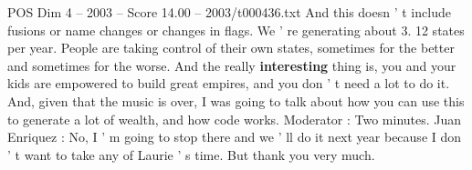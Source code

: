 \begin{textsample}{POS Dim 4 – 2003 – Score 14.00 – 2003/t000436.txt}
And this doesn ' t include fusions or name changes or changes in flags.
We ' re generating about 3. 12 states per year.
People are taking control of their own states, sometimes for the better and sometimes for the worse.
And the really \textbf{interesting} thing is, you and your kids are empowered to build great empires, and you don ' t need a lot to do it.
And, given that the music is over, I was going to talk about how you can use this to generate a lot of wealth, and how code works.
Moderator : Two minutes.
Juan Enriquez : No, I ' m going to stop there and we ' ll do it next year because I don ' t want to take any of Laurie ' s time.
But thank you very much.

\end{textsample}

